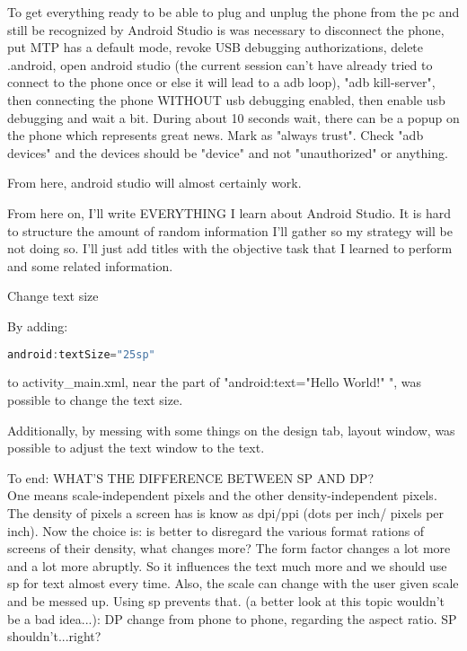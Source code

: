 \par To get everything ready to be able to plug and unplug the phone from the pc and still be recognized by Android Studio is was necessary to disconnect the phone, put MTP has a default mode, revoke USB debugging authorizations, delete .android, open android studio (the current session can't have already tried to connect to the phone once or else it will lead to a adb loop), "adb kill-server", then connecting the phone WITHOUT usb debugging enabled, then enable usb debugging and wait a bit. During about 10 seconds wait, there can be a popup on the phone which represents great news. Mark as "always trust". Check "adb devices" and the devices should be "device" and not "unauthorized" or anything.

\par From here, android studio will almost certainly work.

\vspace{1cm}

\par From here on, I'll write EVERYTHING I learn about Android Studio. It is hard to structure the amount of random information I'll gather so my strategy will be not doing so. I'll just add titles with the objective task that I learned to perform and some related information. 


{\Large Change text size}
\par By adding:

\begin{lstlisting}[language=java]
    android:textSize="25sp"
\end{lstlisting}

to activity\_main.xml, near the part of "android:text="Hello World!" ", was possible to change the text size.

\par Additionally, by messing with some things on the design tab, layout window, was possible to adjust the text window to the text.

\par To end: WHAT'S THE DIFFERENCE BETWEEN SP AND DP?\\
One means scale-independent pixels and the other density-independent pixels. The density of pixels a screen has is know as dpi/ppi (dots per inch/ pixels per inch). Now the choice is: is better to disregard the various format rations of screens of their density, what changes more? The form factor changes a lot more and a lot more abruptly. So it influences the text much more and we should use sp for text almost every time. Also, the scale can change with the user given scale and be messed up. Using sp prevents that.
(a better look at this topic wouldn't be a bad idea...): DP change from phone to phone, regarding the aspect ratio. SP shouldn't...right?


